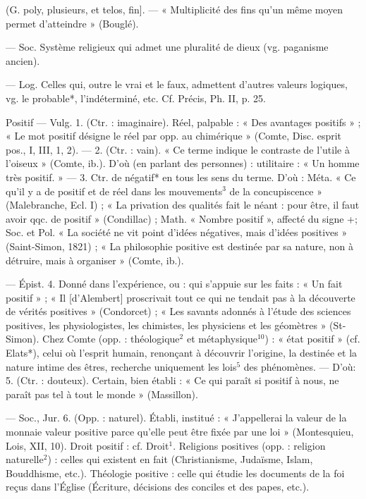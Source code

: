 \begin{itemize}[leftmargin=1cm, label=, itemsep=1pt]
 (G. poly, plusieurs, et telos,
fin]. — « Multiplicité des fins qu’un
même moyen permet d'atteindre »
(Bouglé).

 — Soc. Système religieux qui admet une pluralité de
dieux (vg. paganisme ancien).

 — Log. Celles
qui, outre le vrai et le faux, admettent d’autres valeurs logiques, vg.
le probable*, l’indéterminé, etc. Cf.
Précis, Ph. II, p. 25.

Positif\ib{} — Vulg. 1. (Ctr. : imaginaire).
Réel, palpable : « Des avantages
positifs » ; « Le mot positif désigne le
réel par opp. au chimérique » (Comte,
Disc. esprit pos., I, III, 1, 2). —
2. (Ctr. : vain). « Ce terme indique le
contraste de l’utile à l'oiseux »
(Comte, ib.). D'où (en parlant des
personnes) : utilitaire : « Un homme
très positif. » — 3. Ctr. de négatif*
en tous les sens du terme. D'où :
Méta. « Ce qu’il y a de positif et de réel
dans les mouvements$^3$ de la concupiscence »
(Malebranche, Ecl. I) ; « La
privation des qualités fait le néant :
pour être, il faut avoir qqc. de
positif » (Condillac) ; Math. « Nombre
positif », affecté du signe +;
Soc. et Pol. « La société ne vit point
d'idées négatives, mais d'idées
positives » (Saint-Simon, 1821) ;
« La philosophie positive est destinée
par sa nature, non à détruire,
mais à organiser » (Comte, ib.).

— Épist. 4. Donné dans l’expérience, ou : qui s’appuie sur les faits :
« Un fait positif » ; « Il [d’Alembert]
proscrivait tout ce qui ne tendait
pas à la découverte de vérités positives » (Condorcet) ; « Les savants
adonnés à l’étude des sciences positives, les physiologistes, les chimistes, les physiciens et les géomètres » (St-Simon). Chez Comte
(opp. : théologique$^2$ et métaphysique$^{10}$) : « état positif » (cf. Elats*),
celui où l’esprit humain, renonçant
à découvrir l’origine, la destinée et
la nature intime des êtres, recherche
uniquement les lois$^5$ des phénomènes. — D'où: 5. (Ctr. : douteux).
Certain, bien établi : « Ce qui paraît
si positif à nous, ne paraît pas tel à
tout le monde » (Massillon).

— Soc., Jur. 6. (Opp. : naturel).
Établi, institué : « J’appellerai la
valeur de la monnaie valeur positive parce qu’elle peut être fixée par
une loi » (Montesquieu, Lois, XII,
10). Droit positif : cf. Droit$^1$. Religions positives (opp. : religion naturelle$^2$) : celles qui existent en fait
(Christianisme, Judaïsme, Islam,
Bouddhisme, etc.). Théologie positive : celle qui étudie les documents
de la foi reçus dans l’Église (Écriture, décisions des conciles et des
papes, etc.).


\end{itemize}
